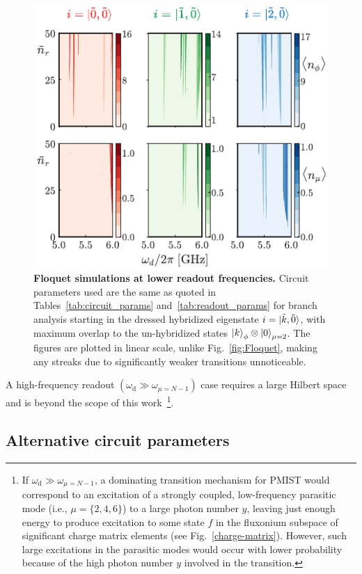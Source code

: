 \documentclass[%
reprint,
superscriptaddress,
 amsmath,amssymb,
 aps,
 prx,
longbibliography,
floatfix,
]{revtex4-2}
\begin{document}
\begin{figure}[t]
    \centering
    \includegraphics[width=\linewidth]{Figures/Floquet_low.pdf}
    \caption{{\bf Floquet simulations at lower readout frequencies.} Circuit parameters used are the same as quoted in Tables~\ref{tab:circuit_params} and~\ref{tab:readout_params} for branch analysis starting in the dressed hybridized eigenstate $i=\ket{\tilde{k},\tilde{0}}$, with maximum overlap to the un-hybridized states $\ket{k}_\phi\otimes\ket{0}_{\mu=2}$. The figures are plotted in linear scale, unlike Fig.~\ref{fig:Floquet}, making any streaks due to significantly weaker transitions unnoticeable.}
    \label{fig:Flo_low}
\end{figure}

A high-frequency readout $(\omega_\textrm{d}\gg \omega_{\mu=N-1})$ case requires a large Hilbert space and is beyond the scope of this work~\footnote{If $\omega_\textrm{d}\gg \omega_{\mu=N-1}$, a dominating transition mechanism for PMIST would correspond to an excitation of a strongly coupled, low-frequency parasitic mode (i.e., $\mu=\{2,4,6\}$) to a large photon number $y$, leaving just enough energy to produce excitation to some state $f$ in the fluxonium subspace of significant charge matrix elements (see Fig.~\ref{charge-matrix}). However, such large excitations in the parasitic modes would occur with lower probability because of the high photon number $y$ involved in the transition.}.

\subsection{Alternative circuit parameters}\label{Will_circuit}
\end{document}
